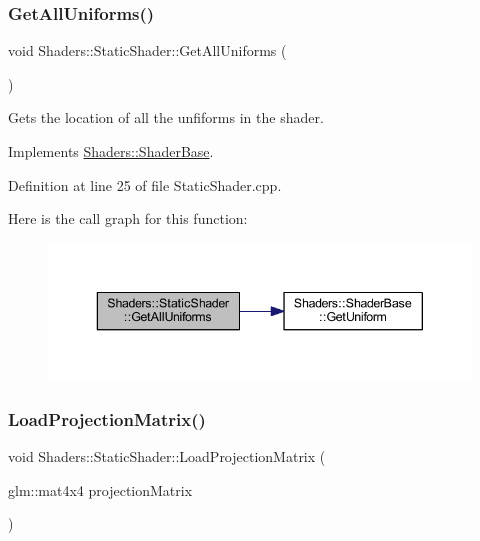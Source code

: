 \subsubsection{\texorpdfstring{Get\+All\+Uniforms()}{GetAllUniforms()}}
{\footnotesize\ttfamily void Shaders\+::\+Static\+Shader\+::\+Get\+All\+Uniforms (\begin{DoxyParamCaption}{ }\end{DoxyParamCaption})\hspace{0.3cm}{\ttfamily [virtual]}}

Gets the location of all the unfiforms in the shader. 

Implements \hyperlink{class_shaders_1_1_shader_base_ade949aa1626fbddd264a51b1dbb9a7cc}{Shaders\+::\+Shader\+Base}.



Definition at line 25 of file Static\+Shader.\+cpp.

Here is the call graph for this function\+:
\nopagebreak
\begin{figure}[H]
\begin{center}
\leavevmode
\includegraphics[width=343pt]{class_shaders_1_1_static_shader_a2417ca33a617fe8a8cb30ec3b5e866fa_cgraph}
\end{center}
\end{figure}
\mbox{\label{class_shaders_1_1_static_shader_a7133b5436145e2769cb940835e59a5f7}} 
\subsubsection{\texorpdfstring{Load\+Projection\+Matrix()}{LoadProjectionMatrix()}}
{\footnotesize\ttfamily void Shaders\+::\+Static\+Shader\+::\+Load\+Projection\+Matrix (\begin{DoxyParamCaption}\item[{glm\+::mat4x4}]{projection\+Matrix }\end{DoxyParamCaption})}

